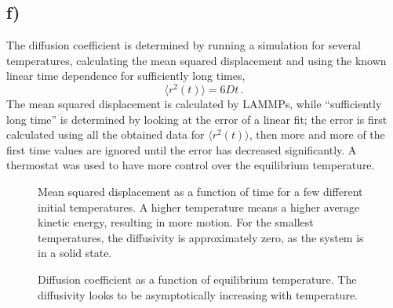 \documentclass[11pt,british,a4paper]{report}
\begin{document}
\subsection*{f)}
The diffusion coefficient is determined by running a simulation for several temperatures, calculating the mean squared displacement and using the known linear time dependence for sufficiently long times,
\[
    \langle r^2(t)\rangle = 6Dt\,.
\]
The mean squared displacement is calculated by LAMMPs, while ``sufficiently long time'' is determined by looking at the error of a linear fit; the error is first calculated using all the obtained data for \(\langle r^2(t)\rangle\), then more and more of the first time values are ignored until the error has decreased significantly. A thermostat was used to have more control over the equilibrium temperature.
\tikzexternaldisable
\begin{figure}[htbp]
    \centering
    \caption{Mean squared displacement as a function of time for a few different initial temperatures. A higher temperature means a higher average kinetic energy, resulting in more motion. For the smallest temperatures, the diffusivity is approximately zero, as the system is in a solid state.}%
    \label{fig:msdtime}
\end{figure}
\begin{figure}[htbp]
    \centering
    \caption{Diffusion coefficient as a function of equilibrium temperature. The diffusivity looks to be asymptotically increasing with temperature.}\label{fig:presstemp}
\end{figure}
\end{document}
